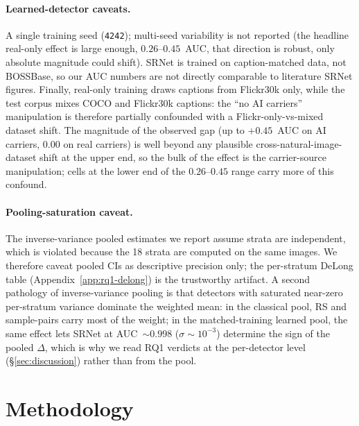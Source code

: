 \documentclass[10pt,twocolumn,a4paper]{article}
\DeclareRobustCommand{\by}[1]{\textnormal{\normalfont\footnotesize\space--- #1}}
\begin{document}
\paragraph{Learned-detector caveats.} A single training seed (\texttt{4242}); multi-seed variability is not reported (the headline real-only effect is large enough, $0.26$--$0.45$~AUC, that direction is robust, only absolute magnitude could shift). SRNet is trained on caption-matched data, not BOSSBase, so our AUC numbers are not directly comparable to literature SRNet figures. Finally, real-only training draws captions from Flickr30k only, while the test corpus mixes COCO and Flickr30k captions: the ``no AI carriers'' manipulation is therefore partially confounded with a Flickr-only-vs-mixed dataset shift. The magnitude of the observed gap (up to $+0.45$~AUC on AI carriers, $0.00$ on real carriers) is well beyond any plausible cross-natural-image-dataset shift at the upper end, so the bulk of the effect is the carrier-source manipulation; cells at the lower end of the $0.26$--$0.45$ range carry more of this confound.

\paragraph{Pooling-saturation caveat.} The inverse-variance pooled estimates we report assume strata are independent, which is violated because the 18 strata are computed on the same images. We therefore caveat pooled CIs as descriptive precision only; the per-stratum DeLong table (Appendix~\ref{app:rq1-delong}) is the trustworthy artifact. A second pathology of inverse-variance pooling is that detectors with saturated near-zero per-stratum variance dominate the weighted mean: in the classical pool, RS and sample-pairs carry most of the weight; in the matched-training learned pool, the same effect lets SRNet at AUC~$\sim 0.998$ ($\sigma\!\sim\!10^{-3}$) determine the sign of the pooled $\Delta$, which is why we read RQ1 verdicts at the per-detector level (\S\ref{sec:discussion}) rather than from the pool.

\section[Conclusion and Future Work\by{\textbf{Writer:} Jimena Narvaez  \textbf{Reviewer:} Daria \textbf{Contributor:}  Nikolas}]{Methodology}
\label{sec:conclusion}
\end{document}
